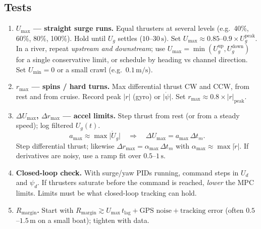 \documentclass[11pt,a4paper]{article}
\begin{document}
\subsection{Tests}
\begin{enumerate}
  \item \textbf{\(U_{\max}\) --- straight surge runs.}
    Equal thrusters at several levels (e.g.\ 40\%, 60\%, 80\%, 100\%).
    Hold until \(U_g\) settles (\(10\)--\(30\,\mathrm{s}\)).
    Set \(U_{\max}\approx 0.85\)--\(0.9\times U_g^{\mathrm{peak}}\).
    In a river, repeat \emph{upstream and downstream}; use
    \(U_{\max}=\min(U_g^{\mathrm{up}},U_g^{\mathrm{down}})\) for a single
    conservative limit, or schedule by heading vs channel direction.
    Set \(U_{\min}=0\) or a small crawl (e.g.\ \(0.1\,\mathrm{m/s}\)).

  \item \textbf{\(r_{\max}\) --- spins / hard turns.}
    Max differential thrust CW and CCW, from rest and from cruise.
    Record peak \(\lvert r\rvert\) (gyro) or \(\lvert\dot\psi\rvert\).
    Set \(r_{\max}\approx 0.8\times\lvert r\rvert_{\mathrm{peak}}\).

  \item \textbf{\(\Delta U_{\max}\), \(\Delta r_{\max}\) --- accel limits.}
    Step thrust from rest (or from a steady speed); log filtered \(U_g(t)\).
    \[
      a_{\max}\approx\max\lvert\dot U_g\rvert
      \quad\Rightarrow\quad
      \Delta U_{\max}=a_{\max}\,\Delta t_m.
    \]
    Step differential thrust; likewise
    \(\Delta r_{\max}=\alpha_{\max}\,\Delta t_m\) with
    \(\alpha_{\max}\approx\max\lvert\dot r\rvert\).
    If derivatives are noisy, use a ramp fit over \(0.5\)--\(1\,\mathrm{s}\).

  \item \textbf{Closed-loop check.}
    With surge/yaw PIDs running, command steps in \(U_d\) and \(\psi_d\).
    If thrusters saturate before the command is reached, \emph{lower}
    the MPC limits. Limits must be what closed-loop tracking can hold.

  \item \textbf{\(R_{\mathrm{margin}}\).}
    Start with
    \(R_{\mathrm{margin}}\gtrsim U_{\max}\,t_{\mathrm{lag}}+\text{GPS noise}
    +\text{tracking error}\)
    (often \(0.5\)--\(1.5\,\mathrm{m}\) on a small boat); tighten with data.
\end{enumerate}
\end{document}
